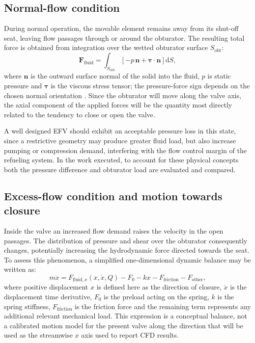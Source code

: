 \subsection{Normal-flow condition}

During normal operation, the movable element remains away from its shut-off seat, leaving flow passages through or around the obturator. The resulting total force is obtained from integration over the wetted obturator surface $S_{\mathrm{obt}}$:
\begin{equation}
\mathbf{F}_{\mathrm{fluid}}=
\int_{S_{\mathrm{obt}}}\left[-p\,\mathbf{n}+\boldsymbol{\tau}\cdot\mathbf{n}\right]\mathrm{d}S,
\label{eq:efv_surface_force}
\end{equation}
where $\mathbf{n}$ is the outward surface normal of the solid into the fluid, $p$ is static pressure and $\boldsymbol{\tau}$ is the viscous stress tensor; the pressure-force sign depends on the chosen normal orientation \cite{white2016,moukalled2016}. Since the obturator will move along the valve axis, the axial component of the applied forces will be the quantity most directly related to the tendency to close or open the valve.

A well designed EFV should exhibit an acceptable pressure loss in this state, since a restrictive geometry may produce greater fluid load, but also increase pumping or compression demand, interfering with the flow control margin of the refueling system. In the work executed, to account for these physical concepts both the pressure difference and obturator load are evaluated and compared.

\subsection{Excess-flow condition and motion towards closure}

Inside the valve an increased flow demand raises the velocity in the open passages. The distribution of pressure and shear over the obturator consequently changes, potentially increasing the hydrodynamic force directed towards the seat. To assess this phenomenon, a simplified one-dimensional dynamic balance may be written as:
\begin{equation}
m\ddot{x}=
F_{\mathrm{fluid},x}(x,\dot{x},Q)
-F_0-kx-F_{\mathrm{friction}}-F_{\mathrm{other}},
\label{eq:efv_force_balance}
\end{equation}
where positive displacement $x$ is defined here as the direction of closure, $\dot{x}$ is the displacement time derivative, $F_0$ is the preload acting on the spring, $k$ is the spring stiffness, $F_{\mathrm{friction}}$ is the friction force and the remaining term represents any additional relevant mechanical load. This expression is a conceptual balance, not a calibrated motion model for the present valve along the direction that will be used as the streamwise $x$ axis used to report CFD results.


